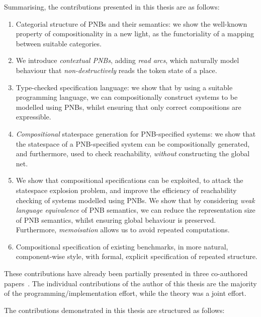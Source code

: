 Summarising, the contributions presented in this thesis are as follows:
\begin{enumerate}
    \item Categorial structure of PNBs and their semantics: we show the
        well-known property of compositionality in a new light, as the
        functoriality of a mapping between suitable categories.
    \item We introduce \emph{contextual PNBs}, adding \emph{read arcs}, which
        naturally model behaviour that \emph{non-destructively} reads the token
        state of a place.
    \item Type-checked specification language: we show that by using a suitable
        programming language, we can compositionally construct systems to be
        modelled using PNBs, whilst ensuring that only correct compositions are
        expressible.
    \item \emph{Compositional} statespace generation for PNB-specified systems:
        we show that the statespace of a PNB-specified system can be
        compositionally generated, and furthermore, used to check
        reachability, \emph{without} constructing the global net.
    \item We show that compositional specifications can be exploited, to attack
        the statespace explosion problem, and improve the efficiency of
        reachability checking of systems modelled using PNBs. We show that by
        considering \emph{weak language equivalence} of PNB semantics, we can
        reduce the representation size of PNB semantics, whilst ensuring global
        behaviour is preserved. Furthermore, \emph{memoisation} allows us to
        avoid repeated computations.
    \item Compositional specification of existing benchmarks, in more natural,
        component-wise style, with formal, explicit specification of repeated
        structure.
\end{enumerate}

These contributions have already been partially presented in three co-authored
papers~\cite{Sobocinski2013,Sobocinski2014,Rathke2014}. The individual contributions of the author
of this thesis are the majority of the programming/implementation effort, while the theory was a
joint effort.

The contributions demonstrated in this thesis are structured as follows:

